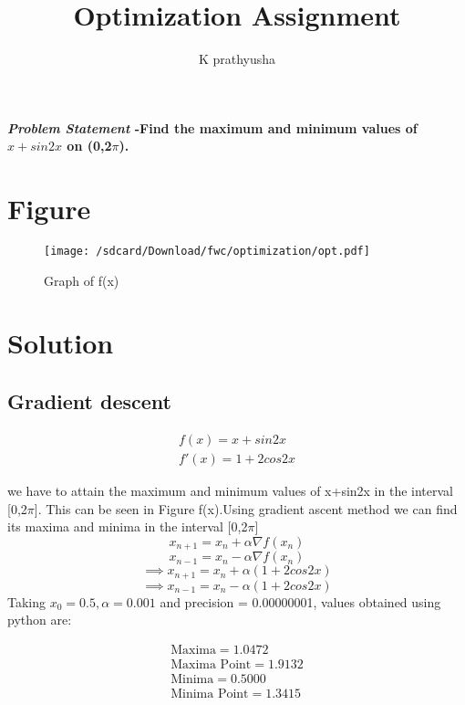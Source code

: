 \documentclass[journal,10pt,twocolumn]{article}
\title{\textbf{Optimization Assignment}}
\author{K prathyusha }
\begin{document}
\maketitle
\paragraph{\textit{Problem Statement} -Find the maximum and minimum values of $x+sin2x$ on (0,2$\pi$).}

\section*{\large Figure}

\begin{figure}[H]
\centering
\texttt{[image: /sdcard/Download/fwc/optimization/opt.pdf]}
\caption{Graph of f(x)}
\label{fig:triangle}
\end{figure}
\section*{\large Solution}

	
    \subsection*{\normalsize Gradient descent}
    
    
    \begin{align}
	\label{eq:vol_varx}
	f(x) = x+sin2x\\
    f'(x) = 1+2cos2x
	\end{align}

we have to attain the maximum and minimum values of x+sin2x in the interval [0,2$\pi$]. This can be seen in Figure f(x).Using gradient ascent method we can find its maxima and minima in the interval [0,2$\pi$]
\begin{equation}
        x_{n+1} = x_n + \alpha \nabla f(x_n) 
\end{equation}
\begin{equation}
	x_{n-1} = x_n - \alpha \nabla f(x_n)  
\end{equation}
\vspace{1mm}
\begin{equation}
\implies x_{n+1}=x_n+\alpha(1+2cos2x)
\end{equation}
\begin{equation}
\implies x_{n-1}=x_n-\alpha(1+2cos2x)
\end{equation}
Taking $x_0=0.5,\alpha=0.001$ and precision = 0.00000001, values obtained using python are:
    

    \begin{align}
        \boxed{\text{Maxima} = 1.0472}\\
        \boxed{\text{Maxima Point} = 1.9132} \\
	\boxed{\text{Minima} = 0.5000} \\
	\boxed{\text{Minima Point} = 1.3415}
    \end{align}
   
    

    





 
\end{document}
